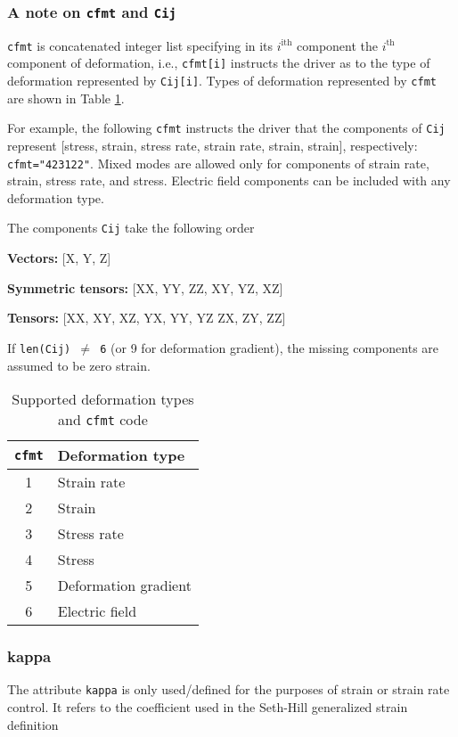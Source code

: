 \documentclass[11pt]{report}
\begin{document}
\subsubsection{A note on \texttt{cfmt} and \texttt{Cij}}
\texttt{cfmt} is concatenated integer list specifying in its $i^\text{ith}$
component the $i^\text{th}$ component of deformation, i.e., \texttt{cfmt[i]}
instructs the driver as to the type of deformation represented by
\texttt{Cij[i]}.  Types of deformation represented by \texttt{cfmt} are shown
in Table \ref{tab:cfmt}.

For example, the following \texttt{cfmt} instructs the driver that the
components of \texttt{Cij} represent [stress, strain, stress rate, strain
rate, strain, strain], respectively: \verb|cfmt="423122"|. Mixed modes are
allowed only for components of strain rate, strain, stress rate, and stress.
Electric field components can be included with any deformation type.

The components \texttt{Cij} take the following order

\textbf{Vectors:} [X, Y, Z]

\textbf{Symmetric tensors:} [XX, YY, ZZ, XY, YZ, XZ]

\textbf{Tensors:} [XX, XY, XZ, YX, YY, YZ ZX, ZY, ZZ]

If \texttt{len(Cij) $\neq$ 6} (or 9 for deformation gradient), the missing
components are assumed to be zero strain.

\begin{table}[h!]
  \centering
  \begin{tabular}[h]{cl}
    \hline
    \hline
    \texttt{cfmt} & Deformation type \\
    \hline
    1 & Strain rate \\
    2 & Strain \\
    3 & Stress rate \\
    4 & Stress \\
    5 & Deformation gradient \\
    6 & Electric field
  \end{tabular}
  \caption{Supported deformation types and \texttt{cfmt} code}
  \label{tab:cfmt}
\end{table}

\subsubsection{kappa}
The attribute \texttt{kappa} is only used/defined for the purposes of strain
or strain rate control. It refers to the coefficient used in the Seth-Hill
generalized strain definition
\end{document}

